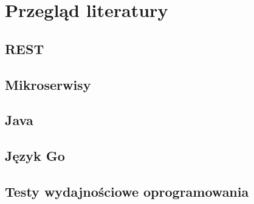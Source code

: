 \chapter{Przegląd literatury}

\section{REST}


\section{Mikroserwisy}


\section{Java}


\section{Język Go}


\section{Testy wydajnościowe oprogramowania}
